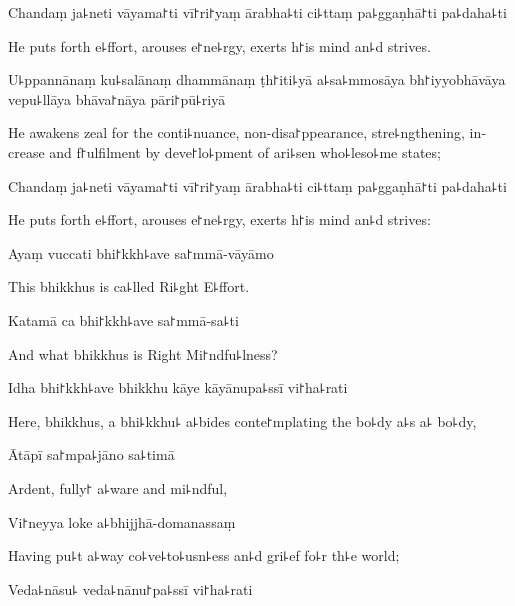Chandaṃ ja꜕neti vāyama꜓ti vī꜓ri꜓yaṃ ārabha꜕ti ci꜕ttaṃ pa꜕ggaṇhā꜓ti pa꜕daha꜕ti

\begin{english}
  He puts forth e꜕ffort, arouses e꜓ne꜕rgy, exerts h꜓is mind an꜕d strives.
\end{english}

U꜕ppannānaṃ ku꜕salānaṃ dhammānaṃ ṭh꜓iti꜕yā a꜕sa꜕mmosāya bh꜓iyyobhāvāya vepu꜕llāya bhāva꜓nāya pāri꜓pū꜕riyā

\begin{english}
  He awakens zeal for the conti꜕nuance, non-disa꜓ppearance, stre꜕ngthening, increase and f꜓ulfilment by deve꜓lo꜕pment of ari꜕sen who꜕leso꜕me states;
\end{english}

Chandaṃ ja꜕neti vāyama꜓ti vī꜓ri꜓yaṃ ārabha꜕ti ci꜕ttaṃ pa꜕ggaṇhā꜓ti pa꜕daha꜕ti

\begin{english}
  He puts forth e꜕ffort, arouses e꜓ne꜕rgy, exerts h꜓is mind an꜕d strives:
\end{english}

Ayaṃ vuccati bhi꜓kkh꜕ave sa꜓mmā-vāyāmo

\begin{english}
  This bhikkhus is ca꜕lled Ri꜕ght E꜕ffort.
\end{english}

Katamā ca bhi꜓kkh꜕ave sa꜓mmā-sa꜕ti

\begin{english}
  And what bhikkhus is Right Mi꜓ndfu꜕lness?
\end{english}

Idha bhi꜓kkh꜕ave bhikkhu kāye kāyānupa꜕ssī vi꜓ha꜕rati

\begin{english}
  Here, bhikkhus, a bhi꜕kkhu꜕ a꜕bides conte꜓mplating the bo꜕dy a꜕s a꜕ bo꜕dy,
\end{english}

Ātāpī sa꜓mpa꜕jāno sa꜕timā

\begin{english}
  Ardent, fully꜓ a꜕ware and mi꜕ndful,
\end{english}

Vi꜓neyya loke a꜕bhijjhā-domanassaṃ

\begin{english}
  Having pu꜕t a꜕way co꜕ve꜕to꜕usn꜕ess an꜕d gri꜕ef fo꜕r th꜕e world;
\end{english}

Veda꜕nāsu꜕ veda꜕nānu꜓pa꜕ssī vi꜓ha꜕rati

